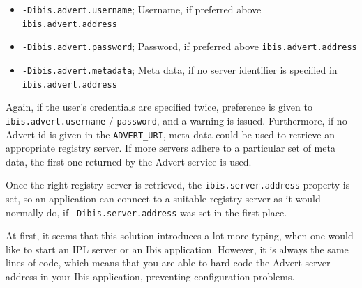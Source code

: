 \begin{itemize}
  \item \texttt{-Dibis.advert.username}; Username, if preferred above
  	\texttt{ibis.advert.address}
  \item \texttt{-Dibis.advert.password}; Password, if preferred above
  	\texttt{ibis.advert.address} 
  \item \texttt{-Dibis.advert.metadata}; Meta data, if no server identifier is
  	specified in \newline \texttt{ibis.advert.address}
\end{itemize}

Again, if the user's credentials are specified twice, preference is given to
\texttt{ibis.advert.username} / \texttt{password}, and a warning is issued.
Furthermore, if no Advert id is given in the \texttt{ADVERT\_URI}, meta data
could be used to retrieve an appropriate registry server. If more servers
adhere to a particular set of meta data, the first one returned by the Advert
service is used.

Once the right registry server is retrieved, the \texttt{ibis.server.address}
property is set, so an application can connect to a suitable registry server as
it would normally do, if \texttt{-Dibis.server.address} was set in the first
place.

At first, it seems that this solution introduces a lot more typing, when one
would like to start an IPL server or an Ibis application. However, it is always
the same lines of code, which means that you are able to hard-code the Advert
server address in your Ibis application, preventing configuration problems.
